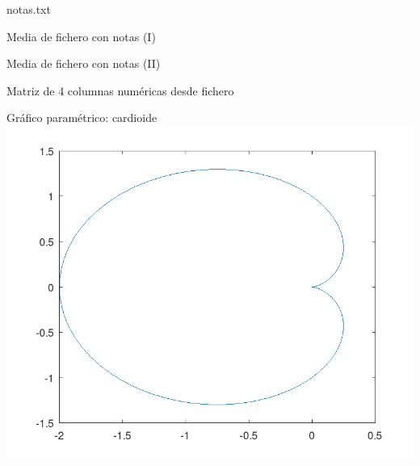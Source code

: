\documentclass[8pt]{extarticle}
\begin{document}
    \begin{multicols}{3}
        \centering
        
        \begin{fileBlock}{notas.txt}
        \end{fileBlock}
        
        \begin{exampleBlock}{Media de fichero con notas (I)}
        \end{exampleBlock}
        
        \begin{exampleBlock}{Media de fichero con notas (II)}
        \end{exampleBlock}
        
        \begin{exampleBlock}{Matriz de 4 columnas num\'ericas desde fichero}
        \end{exampleBlock}
        
        \vfill\null
        \columnbreak
        
        \begin{exampleBlock}{Gr\'afico param\'etrico: cardioide}
            \quad\\
            \includegraphics[width=\textwidth]{plots/cardioide.png}
        \end{exampleBlock}
        

\end{multicols}
\end{document}
